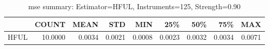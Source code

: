 \begin{table}[ht]
\centering
\caption{mse summary: Estimator=HFUL, Instruments=125, Strength=0.90}
\begin{tabular}{lrrrrrrrr}
\toprule
 & COUNT & MEAN & STD & MIN & 25\% & 50\% & 75\% & MAX \\
\midrule
HFUL & 10.0000 & 0.0034 & 0.0021 & 0.0008 & 0.0023 & 0.0032 & 0.0034 & 0.0071 \\
\bottomrule
\end{tabular}
\end{table}
